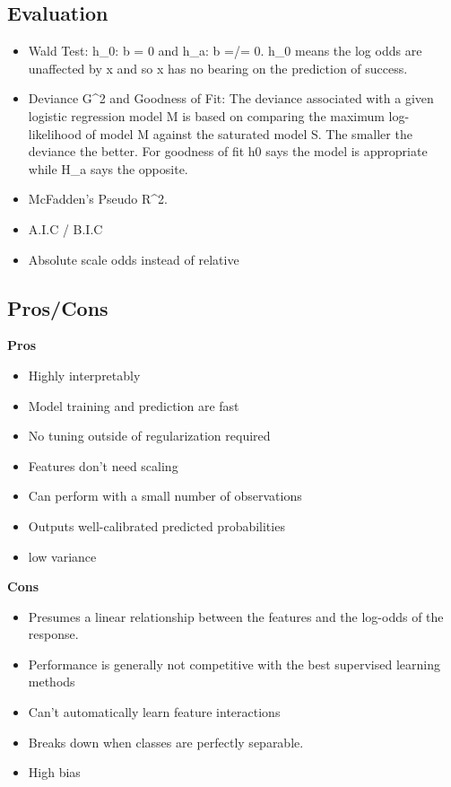 \documentclass[]{book}
\theoremstyle{definition}
\theoremstyle{definition}
\theoremstyle{definition}
\theoremstyle{remark}
\begin{document}
\subsection{Evaluation}\label{evaluation-1}

\begin{itemize}
\item
  Wald Test: h\_0: b = 0 and h\_a: b =/= 0. h\_0 means the log odds are
  unaffected by x and so x has no bearing on the prediction of success.
\item
  Deviance G\^{}2 and Goodness of Fit: The deviance associated with a
  given logistic regression model M is based on comparing the maximum
  log-likelihood of model M against the saturated model S. The smaller
  the deviance the better. For goodness of fit h0 says the model is
  appropriate while H\_a says the opposite.
\item
  McFadden's Pseudo R\^{}2.
\item
  A.I.C / B.I.C
\item
  Absolute scale odds instead of relative
\end{itemize}

\subsection{Pros/Cons}\label{proscons-2}

\textbf{Pros}

\begin{itemize}
\item
  Highly interpretably
\item
  Model training and prediction are fast
\item
  No tuning outside of regularization required
\item
  Features don't need scaling
\item
  Can perform with a small number of observations
\item
  Outputs well-calibrated predicted probabilities
\item
  low variance
\end{itemize}

\textbf{Cons}

\begin{itemize}
\item
  Presumes a linear relationship between the features and the log-odds
  of the response.
\item
  Performance is generally not competitive with the best supervised
  learning methods
\item
  Can't automatically learn feature interactions
\item
  Breaks down when classes are perfectly separable.
\item
  High bias
\end{itemize}
\end{document}
